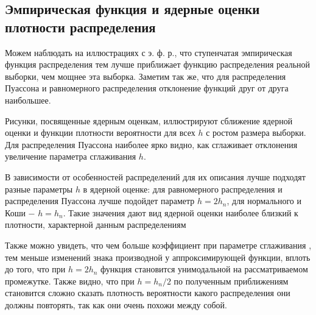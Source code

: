 \subsection{Эмпирическая функция и ядерные оценки плотности распределения}
Можем наблюдать на иллюстрациях с э. ф. р., что ступенчатая эмпирическая функция распределения тем лучше приближает функцию распределения реальной выборки, чем мощнее эта выборка. Заметим так же, что для
распределения Пуассона и равномерного распределения отклонение функций друг от друга наибольшее.

Рисунки, посвященные ядерным оценкам, иллюстрируют сближение ядерной оценки и функции плотности вероятности для всех $h$ с ростом размера
выборки. Для распределения Пуассона наиболее ярко видно, как сглаживает отклонения увеличение параметра сглаживания $h$.

В зависимости от особенностей распределений для их описания лучше подходят разные параметры $h$ в ядерной оценке: для равномерного распределения и распределения Пуассона лучше подойдет параметр $h = 2h_n$, для нормального и Коши − $h = h_n$.
Такие значения дают вид ядерной оценки наиболее близкий к плотности,
характерной данным распределениям

Также можно увидеть, что чем больше коэффициент при параметре сглаживания , тем меньше изменений знака производной у аппроксимирующей функции, вплоть до того, что при $h = 2h_n$ функция становится унимодальной на рассматриваемом промежутке. Также видно, что при $h = h_n / 2$
по полученным приближениям становится сложно сказать плотность вероятности какого распределения они должны повторять, так как они очень
похожи между собой.